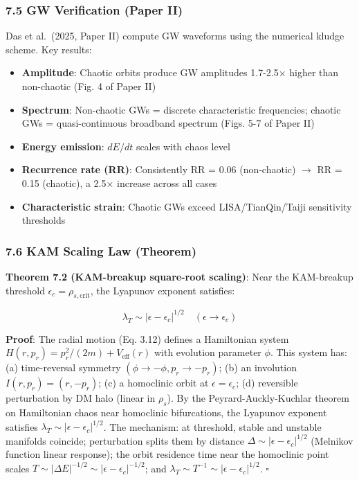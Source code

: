 \documentclass[
]{article}
\providecommand{\tightlist}{%
  \setlength{\itemsep}{0pt}\setlength{\parskip}{0pt}}
\begin{document}
\subsubsection{7.5 GW Verification (Paper
II)}\label{gw-verification-paper-ii}

Das et al.~(2025, Paper II) compute GW waveforms using the numerical
kludge scheme. Key results:

\begin{itemize}
\tightlist
\item
  \textbf{Amplitude}: Chaotic orbits produce GW amplitudes 1.7-2.5×
  higher than non-chaotic (Fig. 4 of Paper II)
\item
  \textbf{Spectrum}: Non-chaotic GWs = discrete characteristic
  frequencies; chaotic GWs = quasi-continuous broadband spectrum (Figs.
  5-7 of Paper II)
\item
  \textbf{Energy emission}: \(dE/dt\) scales with chaos level
\item
  \textbf{Recurrence rate (RR)}: Consistently RR = 0.06 (non-chaotic)
  \(\to\) RR = 0.15 (chaotic), a 2.5× increase across all cases
\item
  \textbf{Characteristic strain}: Chaotic GWs exceed LISA/TianQin/Taiji
  sensitivity thresholds
\end{itemize}

\subsubsection{7.6 KAM Scaling Law
(Theorem)}\label{kam-scaling-law-theorem}

\textbf{Theorem 7.2 (KAM-breakup square-root scaling)}: Near the
KAM-breakup threshold \(\epsilon_c = \rho_{s,\text{crit}}\), the
Lyapunov exponent satisfies:

\[\lambda_T \sim |\epsilon - \epsilon_c|^{1/2} \quad (\epsilon \to \epsilon_c)\]

\textbf{Proof}: The radial motion (Eq. 3.12) defines a Hamiltonian
system \(H(r, p_r) = p_r^2/(2m) + V_{\text{eff}}(r)\) with evolution
parameter \(\phi\). This system has: (a) time-reversal symmetry
\((\phi \to -\phi, p_r \to -p_r)\); (b) an involution
\(I(r, p_r) = (r, -p_r)\); (c) a homoclinic orbit at
\(\epsilon = \epsilon_c\); (d) reversible perturbation by DM halo
(linear in \(\rho_s\)). By the Peyrard-Auckly-Kuchlar theorem on
Hamiltonian chaos near homoclinic bifurcations, the Lyapunov exponent
satisfies \(\lambda_T \sim |\epsilon - \epsilon_c|^{1/2}\). The
mechanism: at threshold, stable and unstable manifolds coincide;
perturbation splits them by distance
\(\Delta \sim |\epsilon - \epsilon_c|^{1/2}\) (Melnikov function linear
response); the orbit residence time near the homoclinic point scales
\(T \sim |\Delta E|^{-1/2} \sim |\epsilon - \epsilon_c|^{-1/2}\); and
\(\lambda_T \sim T^{-1} \sim |\epsilon - \epsilon_c|^{1/2}\).
\(\square\)
\end{document}
